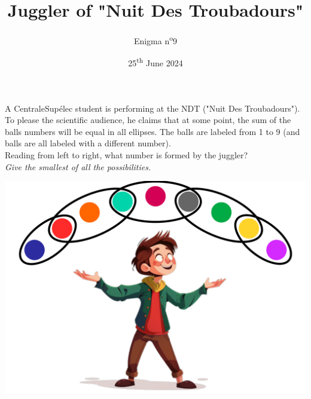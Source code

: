 \documentclass[a4paper, top=10mm]{article}
\title{\textbf{\huge{Juggler of "Nuit Des Troubadours"}}}
\author{Enigma n\textsuperscript{o}9}
\date{25\textsuperscript{th} June 2024}
\begin{document}
	\maketitle
	
	\Large
	A CentraleSupélec student is performing at the NDT ("Nuit Des Troubadours").
	To please the scientific audience, he claims that at some point, the sum of the balls numbers will be equal in all ellipses.
	The balls are labeled from 1 to 9 (and balls are all labeled with a different number).\\
	Reading from left to right, what number is formed by the juggler?\\
	\textit{Give the smallest of all the possibilities.}
	
	\vspace{2cm}
	
	\begin{center}
		\includegraphics[width=\linewidth]{09juggler.pdf}
	\end{center}
	
	
	
\end{document}
